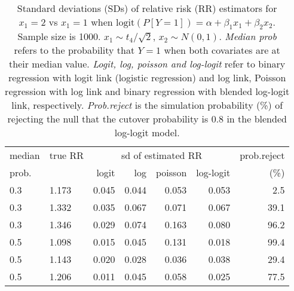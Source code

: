 \documentclass[12pt,a4paper]{article}
\begin{document}
\begin{table}[H] 
\small\sf\centering 
\caption{Standard deviations (SDs) of relative risk (RR) estimators for $x_1=2$ vs $x_1=1$ when $\mbox{logit}(P[Y=1])=\alpha+\beta_1 x_1 + \beta_2 x_2$. Sample size is 1000. $x_1 \sim $$t_4/\sqrt{2}$, $x_2 \sim N(0,1)$. {\it Median prob} refers to the probability that $Y=1$ when both covariates are at their median value. {\it Logit, log, poisson and log-logit} refer to binary regression with logit link (logistic regression) and log link, Poisson regression with log link and binary regression with blended log-logit link, respectively. {\it Prob.reject} is the simulation probability (\%) of rejecting the null that the cutover probability is $0.8$ in the blended log-logit model.} 
\begin{tabular}{llrrrrr} 
\toprule 
median & true RR & \multicolumn{4}{c}{sd of estimated RR} & prob.reject \\ 
prob. & & logit & log & poisson & log-logit  & (\%) \\ \midrule 
0.3 & 1.173 & 0.045 & 0.044 & 0.053 & 0.053 &  2.5 \\  
0.3 & 1.332 & 0.035 & 0.067 & 0.071 & 0.067 & 39.1 \\  
0.3 & 1.346 & 0.029 & 0.074 & 0.163 & 0.080 & 96.2 \\  
0.5 & 1.098 & 0.015 & 0.045 & 0.131 & 0.018 & 99.4 \\  
0.5 & 1.143 & 0.020 & 0.028 & 0.036 & 0.038 & 29.4 \\  
0.5 & 1.206 & 0.011 & 0.045 & 0.058 & 0.025 & 77.5 \\  
\bottomrule 
\end{tabular} 
\end{table} 
\end{document}
